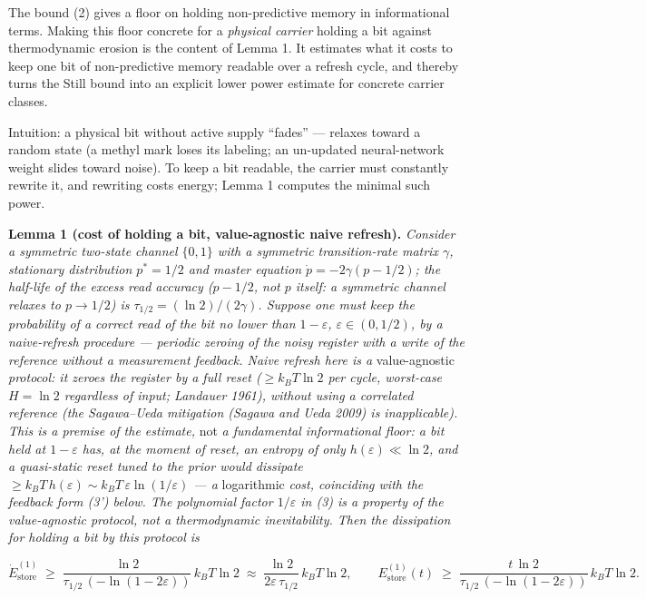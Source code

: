 \documentclass[pdflatex,sn-mathphys-ay]{sn-jnl}
\begin{document}
The bound (2) gives a floor on holding non-predictive memory in informational terms. Making this floor concrete for a \emph{physical carrier} holding a bit against thermodynamic erosion is the content of Lemma 1. It estimates what it costs to keep one bit of non-predictive memory readable over a refresh cycle, and thereby turns the Still bound into an explicit lower power estimate for concrete carrier classes.



Intuition: a physical bit without active supply ``fades'' --- relaxes toward a random state (a methyl mark loses its labeling; an un-updated neural-network weight slides toward noise). To keep a bit readable, the carrier must constantly rewrite it, and rewriting costs energy; Lemma 1 computes the minimal such power.



\textbf{Lemma 1 (cost of holding a bit, value-agnostic naive refresh).} \emph{Consider a symmetric two-state channel \(\{0,1\}\) with a symmetric transition-rate matrix \(\gamma\), stationary distribution \(p^* = 1/2\) and master equation \(\dot p = -2\gamma(p - 1/2)\); the half-life of the excess read accuracy (\(p - 1/2\), not \(p\) itself: a symmetric channel relaxes to \(p \to 1/2\)) is \(\tau_{1/2} = (\ln 2)/(2\gamma)\). Suppose one must keep the probability of a correct read of the bit no lower than \(1 - \varepsilon\), \(\varepsilon \in (0, 1/2)\), by a naive-refresh procedure --- periodic zeroing of the noisy register with a write of the reference without a measurement feedback. Naive refresh here is a} value-agnostic \emph{protocol: it zeroes the register by a full reset (\(\ge k_B T \ln 2\) per cycle, worst-case \(H = \ln 2\) regardless of input; Landauer 1961), without using a correlated reference (the Sagawa--Ueda mitigation (Sagawa and Ueda 2009) is inapplicable). This is a premise of the estimate,} not \emph{a fundamental informational floor: a bit held at \(1-\varepsilon\) has, at the moment of reset, an entropy of only \(h(\varepsilon) \ll \ln 2\), and a quasi-static reset tuned to the prior would dissipate \(\ge k_B T\, h(\varepsilon) \sim k_B T\,\varepsilon\ln(1/\varepsilon)\) --- a} logarithmic \emph{cost, coinciding with the feedback form (3') below. The polynomial factor \(1/\varepsilon\) in (3) is a property of the value-agnostic protocol, not a thermodynamic inevitability. Then the dissipation for holding a bit by this protocol is}



\begin{equation}\dot E_{\text{store}}^{(1)} \;\ge\; \frac{\ln 2}{\tau_{1/2}\,(-\ln(1 - 2\varepsilon))}\, k_B T \ln 2 \;\approx\; \frac{\ln 2}{2\varepsilon\, \tau_{1/2}}\, k_B T \ln 2, \qquad E_{\text{store}}^{(1)}(t) \;\ge\; \frac{t\, \ln 2}{\tau_{1/2}\,(-\ln(1 - 2\varepsilon))}\, k_B T \ln 2. \tag{3}\end{equation}
\end{document}
